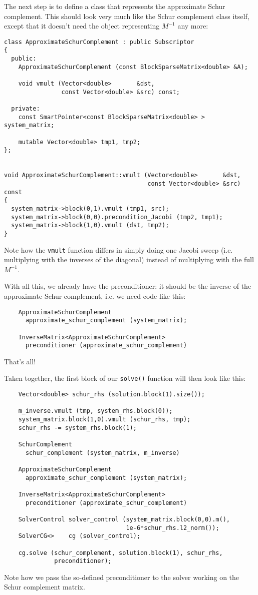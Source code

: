 \documentclass{article}
\begin{document}
The next step is to define a class that represents the approximate Schur
complement. This should look very much like the Schur complement class itself,
except that it doesn't need the object representing $M^{-1}$ any more:
\begin{verbatim}
class ApproximateSchurComplement : public Subscriptor
{
  public:
    ApproximateSchurComplement (const BlockSparseMatrix<double> &A);

    void vmult (Vector<double>       &dst,
                const Vector<double> &src) const;

  private:
    const SmartPointer<const BlockSparseMatrix<double> > system_matrix;
    
    mutable Vector<double> tmp1, tmp2;
};


void ApproximateSchurComplement::vmult (Vector<double>       &dst,
                                        const Vector<double> &src) const
{
  system_matrix->block(0,1).vmult (tmp1, src);
  system_matrix->block(0,0).precondition_Jacobi (tmp2, tmp1);
  system_matrix->block(1,0).vmult (dst, tmp2);
}
\end{verbatim}
Note how the \texttt{vmult} function differs in simply doing one Jacobi sweep
(i.e. multiplying with the inverses of the diagonal) instead of multiplying
with the full $M^{-1}$.

With all this, we already have the preconditioner: it should be the inverse of
the approximate Schur complement, i.e. we need code like this:
\begin{verbatim}
    ApproximateSchurComplement
      approximate_schur_complement (system_matrix);
      
    InverseMatrix<ApproximateSchurComplement>
      preconditioner (approximate_schur_complement)
\end{verbatim}
That's all!

Taken together, the first block of our \texttt{solve()} function will then
look like this:
\begin{verbatim}
    Vector<double> schur_rhs (solution.block(1).size());

    m_inverse.vmult (tmp, system_rhs.block(0));
    system_matrix.block(1,0).vmult (schur_rhs, tmp);
    schur_rhs -= system_rhs.block(1);

    SchurComplement
      schur_complement (system_matrix, m_inverse)
    
    ApproximateSchurComplement
      approximate_schur_complement (system_matrix);
      
    InverseMatrix<ApproximateSchurComplement>
      preconditioner (approximate_schur_complement)
    
    SolverControl solver_control (system_matrix.block(0,0).m(),
                                  1e-6*schur_rhs.l2_norm());
    SolverCG<>    cg (solver_control);

    cg.solve (schur_complement, solution.block(1), schur_rhs,
              preconditioner);
\end{verbatim}
Note how we pass the so-defined preconditioner to the solver working on the
Schur complement matrix.
\end{document}
